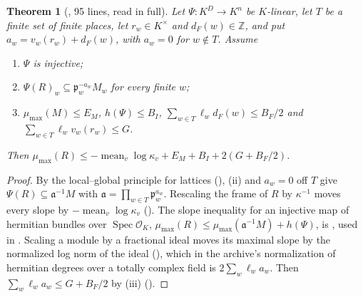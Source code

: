 \documentclass[11pt]{article}
\newtheorem{theorem}{Theorem}
\theoremstyle{remark}
\begin{document}
\begin{theorem}[, 95 lines, read in full]\label{thm:fun}
Let $\Psi\colon K^D\to K^n$ be $K$-linear, let $T$ be a finite set of finite places, let $r_w\in K^\times$ and $d_F(w)\in\mathbb Z$, and put $a_w=v_w(r_w)+d_F(w)$, with $a_w=0$ for $w\notin T$. Assume
\begin{enumerate}[label=(\roman*),nosep]
\item $\Psi$ is injective;
\item $\Psi(R)_w\subseteq\mathfrak p_w^{-a_w}M_w$ for every finite $w$;
\item $\mu_{\max}(M)\le E_M$, $h(\Psi)\le B_I$, $\sum_{w\in T}\ell_wd_F(w)\le B_F/2$ and $\sum_{w\in T}\ell_wv_w(r_w)\le G$.
\end{enumerate}
Then $\mu_{\max}(R)\le-\operatorname{mean}_v\log\kappa_v+E_M+B_I+2(G+B_F/2)$.
\end{theorem}

\begin{proof}
By the local--global principle for lattices (), (ii) and $a_w=0$ off $T$ give $\Psi(R)\subseteq\mathfrak a^{-1}M$ with $\mathfrak a=\prod_{w\in T}\mathfrak p_w^{a_w}$. Rescaling the frame of $R$ by $\kappa^{-1}$ moves every slope by $-\operatorname{mean}_v\log\kappa_v$ (). The slope inequality for an injective map of hermitian bundles over $\operatorname{Spec}\mathcal O_K$, $\mu_{\max}(R)\le\mu_{\max}(\mathfrak a^{-1}M)+h(\Psi)$, is , used in . Scaling a module by a fractional ideal moves its maximal slope by the normalized log norm of the ideal (), which in the archive's normalization of hermitian degrees over a totally complex field is $2\sum_w\ell_wa_w$. Then $\sum_w\ell_wa_w\le G+B_F/2$ by (iii) ().
\end{proof}
\end{document}
